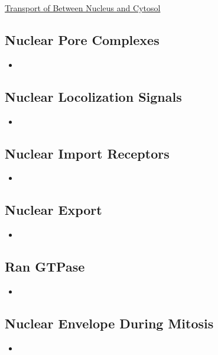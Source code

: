 \documentclass[12pt,letterpaper]{article}
\begin{document}
\hypertarget{12.2}{}
\begin{secbox}{\hyperlink{12}{Transport of Between Nucleus and Cytosol}}{
    \hypertarget{12.2.1}{\subsection*{Nuclear Pore Complexes}}
    \begin{itemize}
        \item
    \end{itemize}

    \hypertarget{12.2.2}{\subsection*{Nuclear Locolization Signals}}
    \begin{itemize}
        \item
    \end{itemize}

    \hypertarget{12.2.3}{\subsection*{Nuclear Import Receptors}}
    \begin{itemize}
        \item
    \end{itemize}

    \hypertarget{12.2.4}{\subsection*{Nuclear Export}}
    \begin{itemize}
        \item
    \end{itemize}
    
    \hypertarget{12.2.5}{\subsection*{Ran GTPase}}
    \begin{itemize}
        \item
    \end{itemize}
    
    \hypertarget{12.2.6}{\subsection*{Nuclear Envelope During Mitosis}}
    \begin{itemize}
        \item
    \end{itemize}
    
}
\end{secbox}
\end{document}
